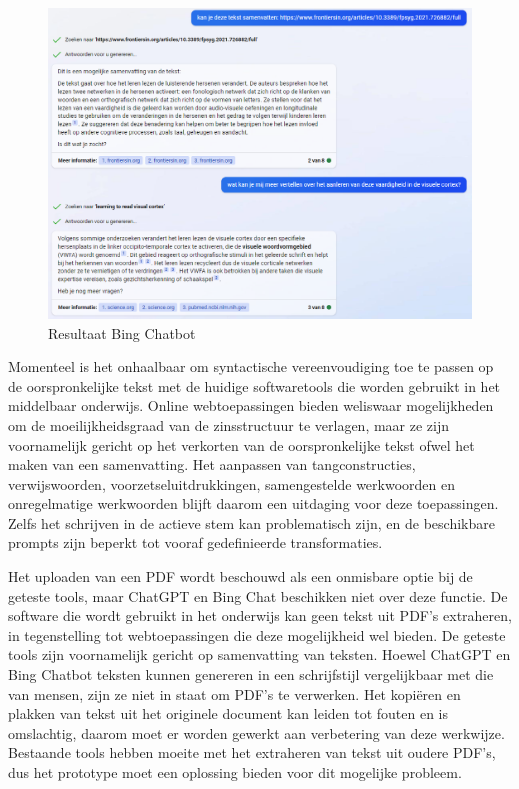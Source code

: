 \begin{figure}[H]
	\includegraphics{img/bing-ai-chatbot-example.png}
	\caption{Resultaat Bing Chatbot}
	\label{img:tryout-bing-ai}
\end{figure}

\medspace

Momenteel is het onhaalbaar om syntactische vereenvoudiging toe te passen op de oorspronkelijke tekst met de huidige softwaretools die worden gebruikt in het middelbaar onderwijs. Online webtoepassingen bieden weliswaar mogelijkheden om de moeilijkheidsgraad van de zinsstructuur te verlagen, maar ze zijn voornamelijk gericht op het verkorten van de oorspronkelijke tekst ofwel het maken van een samenvatting. Het aanpassen van tangconstructies, verwijswoorden, voorzetseluitdrukkingen, samengestelde werkwoorden en onregelmatige werkwoorden blijft daarom een uitdaging voor deze toepassingen. Zelfs het schrijven in de actieve stem kan problematisch zijn, en de beschikbare prompts zijn beperkt tot vooraf gedefinieerde transformaties.

\medspace

Het uploaden van een PDF wordt beschouwd als een onmisbare optie bij de geteste tools, maar ChatGPT en Bing Chat beschikken niet over deze functie. De software die wordt gebruikt in het onderwijs kan geen tekst uit PDF's extraheren, in tegenstelling tot webtoepassingen die deze mogelijkheid wel bieden. De geteste tools zijn voornamelijk gericht op samenvatting van teksten. Hoewel ChatGPT en Bing Chatbot teksten kunnen genereren in een schrijfstijl vergelijkbaar met die van mensen, zijn ze niet in staat om PDF's te verwerken. Het kopiëren en plakken van tekst uit het originele document kan leiden tot fouten en is omslachtig, daarom moet er worden gewerkt aan verbetering van deze werkwijze. Bestaande tools hebben moeite met het extraheren van tekst uit oudere PDF's, dus het prototype moet een oplossing bieden voor dit mogelijke probleem.

